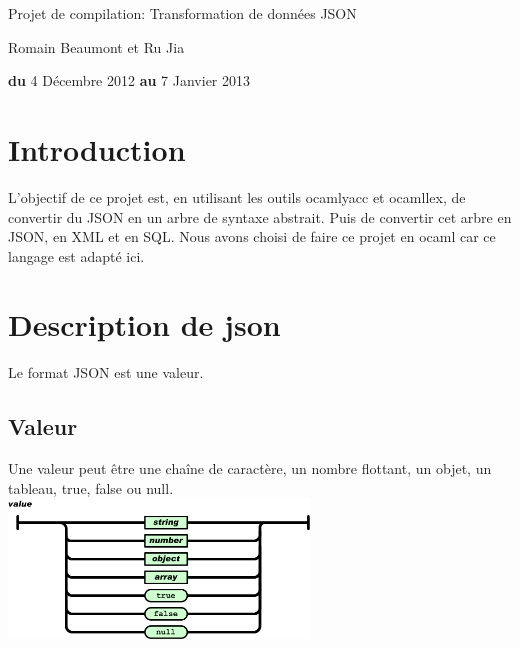 \documentclass{report}
\begin{document}
\begin{titlepage}
\begin{center}
\end{center}

\flushright
\begin{center}
\bigskip
\bigskip
\bigskip
\bigskip
\bigskip
\bigskip
\bigskip
\bigskip
\bigskip
\bigskip
\bigskip
\bigskip
\huge{Projet de compilation: Transformation de données JSON}\\
\end{center}
\begin{center}
\bigskip
\bigskip
\bigskip
\bigskip
\bigskip
\bigskip
\bigskip
\bigskip
\bigskip
Romain Beaumont et Ru Jia\\
\bigskip
\bigskip
\bigskip
\bigskip
\bigskip
\bigskip
\bigskip
\bigskip
\bigskip
\bigskip
\bigskip
\bigskip
\bigskip
\bigskip
\bigskip

\textbf{du} 4 Décembre 2012  \textbf{au} 7 Janvier 2013

\bigskip
\bigskip
\bigskip
\end{center}
\end{titlepage}
 
\tableofcontents


\chapter{Introduction}
\par
L'objectif de ce projet est, en utilisant les outils ocamlyacc et ocamllex, de convertir du JSON en un arbre de syntaxe abstrait. Puis de convertir cet arbre en JSON, en XML et en SQL. Nous avons choisi de faire ce projet en ocaml car ce langage est adapté ici.

\chapter{Description de json}
\par
Le format JSON est une valeur.

\section{Valeur}
Une valeur peut être une chaîne de caractère, un nombre flottant, un objet, un tableau, true, false ou null.
\\
\includegraphics[width=8cm]{value.png}
\end{document}
